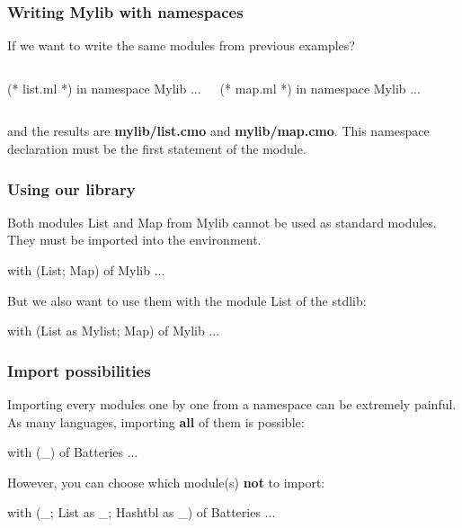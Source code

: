 \documentclass{beamer}
\begin{document}
\begin{frame}[fragile]
\frametitle{Writing Mylib with namespaces}

If we want to write the same modules from previous examples?

\pause

\begin{columns}%
    \begin{OCaml}
      (* list.ml *)
      in namespace Mylib
      ...
    \end{OCaml}

    \begin{OCaml}
      (* map.ml *)
      in namespace Mylib
      ...
    \end{OCaml}
\end{columns}

and the results are \textbf{mylib/list.cmo} and \textbf{mylib/map.cmo}.
This namespace declaration must be the first statement of the module.
\end{frame}

\begin{frame}[fragile]
\frametitle{Using our library}

Both modules List and Map from Mylib cannot be used as standard modules. They
must be imported into the environment.

\pause

\begin{OCaml}
with (List; Map) of Mylib
...
\end{OCaml}

\pause

But we also want to use them with the module List of the stdlib:

\begin{OCaml}
with (List as Mylist; Map) of Mylib
...
\end{OCaml}

\end{frame}

\begin{frame}[fragile]
\frametitle{Import possibilities}

Importing every modules one by one from a namespace can be extremely painful. As
many languages, importing \textbf{all} of them is possible:

\begin{OCaml}
with (_) of Batteries
...
\end{OCaml}

\pause

However, you can choose which module(s) \textbf{not} to import:
\begin{OCaml}
with (_; List as _; Hashtbl as _) of Batteries
...
\end{OCaml}

\end{frame}
\end{document}
